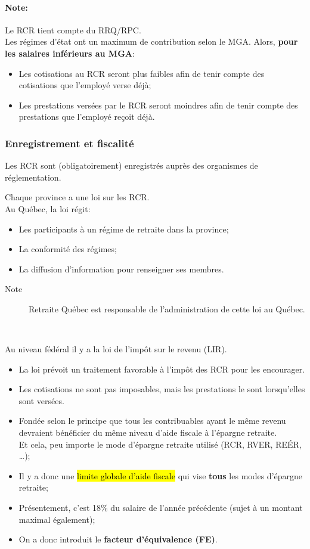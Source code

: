 \documentclass[10pt, french]{article}
\begin{document}
\begin{multicols*}{3}
\paragraph{Note:}	Le RCR tient compte du RRQ/RPC.\\

Les régimes d'état ont un maximum de contribution selon le MGA. Alors, \textbf{pour les salaires inférieurs au MGA}:
\begin{itemize}[leftmargin = *]
	\item	Les cotisations au RCR seront plus faibles afin de tenir compte des cotisations que  l'employé verse déjà;
	\item	Les prestations versées par le RCR seront moindres afin de tenir compte des prestations que l'employé reçoit déjà.
\end{itemize}

\subsubsection*{Enregistrement et fiscalité}
Les RCR sont (obligatoirement) enregistrés auprès des organismes de réglementation.

Chaque province a une loi sur les RCR. \\
Au Québec, la loi régit:
\begin{itemize}[leftmargin = *]
	\item	Les participants à un régime de retraite dans la province;
	\item	La conformité des régimes;
	\item	La diffusion d'information pour renseigner ses membres.
\end{itemize}
\begin{description}
	\item[Note]	Retraite Québec est responsable de l'administration de cette loi au Québec. 
\end{description}

\

Au niveau fédéral il y a la loi de l'impôt sur le revenu (LIR).
\begin{itemize}[leftmargin = *]
	\item	La loi prévoit un traitement favorable à l'impôt des RCR pour les encourager.
	\item	Les cotisations ne sont pas imposables, mais les prestations le sont lorsqu'elles sont versées.
	\item	Fondée selon le principe que tous les contribuables ayant le même revenu devraient bénéficier du même niveau d’aide fiscale à l’épargne retraite.\\
			Et cela, peu importe le mode d’épargne retraite utilisé (RCR, RVER, REÉR, \dots);
	\item	Il y a donc une \hl{limite globale d'aide fiscale} qui vise \textbf{tous} les modes d'épargne retraite;
	\item	Présentement, c'est 18\% du salaire de l'année précédente (sujet à un montant maximal également);
	\item	On a donc introduit le \textbf{facteur d'équivalence (FE)}.
\end{itemize}


\end{multicols*}
\end{document}
